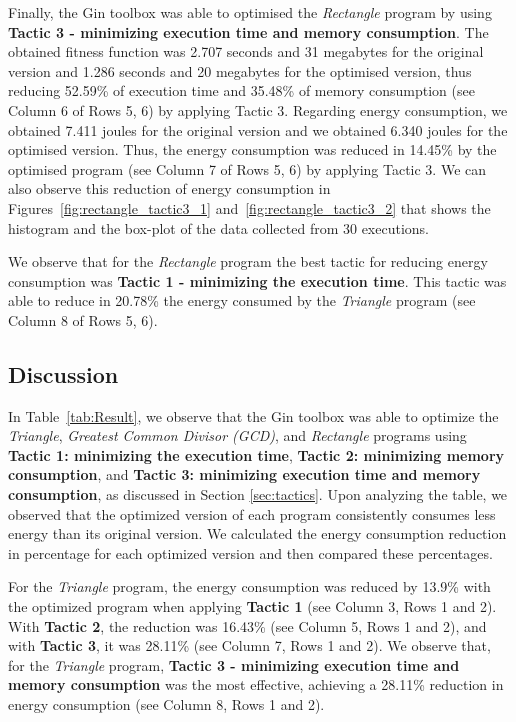 \vspace{.5em}
Finally, the Gin toolbox was able to optimised the \textit{Rectangle} program by using \textbf{Tactic 3 - minimizing execution time and memory consumption}. The obtained fitness function was 2.707 seconds and 31 megabytes for the original version and 1.286 seconds and 20 megabytes for the optimised version, thus reducing 52.59\% of execution time and 35.48\% of memory consumption (see Column 6 of Rows 5, 6) by applying Tactic 3. Regarding energy consumption, we obtained 7.411 joules for the original version and we obtained 6.340 joules for the optimised version. Thus, the energy consumption was reduced in 14.45\% by the optimised program (see Column 7 of Rows 5, 6) by applying Tactic 3. We can also observe this reduction of energy consumption in Figures~\ref{fig:rectangle_tactic3_1} and~\ref{fig:rectangle_tactic3_2} that shows the histogram and the box-plot of the data collected from 30 executions.

\vspace{.5em}
We observe that for the \textit{Rectangle} program the best tactic for reducing energy consumption was \textbf{Tactic 1 - minimizing the execution time}. This tactic was able to reduce in 20.78\% the energy consumed by the  \textit{Triangle} program (see Column 8 of Rows 5, 6).

\vspace{-5pt}
\subsection{Discussion}

In Table~\ref{tab:Result}, we observe that the Gin toolbox was able to optimize the \textit{Triangle}, \textit{Greatest Common Divisor (GCD)}, and \textit{Rectangle} programs using \textbf{Tactic 1: minimizing the execution time}, \textbf{Tactic 2: minimizing memory consumption}, and \textbf{Tactic 3: minimizing execution time and memory consumption}, as discussed in Section \ref{sec:tactics}. Upon analyzing the table, we observed that the optimized version of each program consistently consumes less energy than its original version. We calculated the energy consumption reduction in percentage for each optimized version and then compared these percentages. 

\vspace{.5em}
For the \textit{Triangle} program, the energy consumption was reduced by 13.9\% with the optimized program when applying \textbf{Tactic 1} (see Column 3, Rows 1 and 2). With \textbf{Tactic 2}, the reduction was 16.43\% (see Column 5, Rows 1 and 2), and with \textbf{Tactic 3}, it was 28.11\% (see Column 7, Rows 1 and 2). We observe that, for the \textit{Triangle} program, \textbf{Tactic 3 - minimizing execution time and memory consumption} was the most effective, achieving a 28.11\% reduction in energy consumption (see Column 8, Rows 1 and 2).

